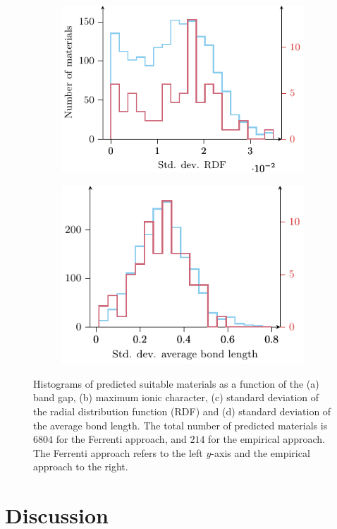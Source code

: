 \documentclass[superscriptaddress,
preprint,
 amsmath,amssymb,
 aps,
]{revtex4-2}
\begin{document}
\begin{figure}[t]
\begin{subfigure}[b]{0.45\textwidth}
    \includegraphics{figure7c.pdf}
    \subcaption{}
\end{subfigure}
\begin{subfigure}[b]{0.45\textwidth}
    \includegraphics{figure7d.pdf}
    \subcaption{}
\end{subfigure}
\caption{Histograms of predicted suitable materials as a function of the (a) band gap, (b) maximum ionic character, (c) standard deviation of the radial distribution function (RDF) and (d) standard deviation of the average bond length. The total number of predicted materials is  $6804$ for the Ferrenti approach, and $214$ for the empirical approach. The Ferrenti approach refers to the left $y$-axis and the empirical approach to the right.
}
\label{fig:histogram_new}
\end{figure}

\section*{Discussion} 
\end{document}

